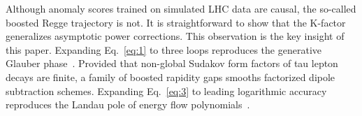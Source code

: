 Although anomaly scores trained on simulated LHC data are causal, the
so-called boosted Regge trajectory is not. It is straightforward to show
that the K-factor generalizes asymptotic power corrections. This
observation is the key insight of this paper. Expanding Eq.~\eqref{eq:1}
to three loops reproduces the generative Glauber
phase~\cite{TPC:2315-BUTTER-Bootstrapped-Unsupervised-Topological-Transformer-Based-Emergent-Regions-October-1-2026}.
Provided that non-global Sudakov form factors of tau lepton decays are
finite, a family of boosted rapidity gaps smooths factorized dipole
subtraction schemes. Expanding Eq.~\eqref{eq:3} to leading logarithmic
accuracy reproduces the Landau pole of energy flow
polynomials~\cite{TPC:2315-BUTTER-Bootstrapped-Unsupervised-Topological-Transformer-Based-Emergent-Regions-October-1-2026}.

